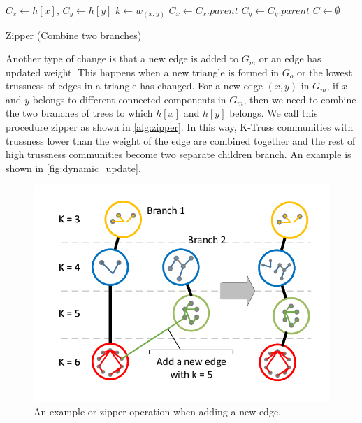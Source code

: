 \begin{algorithm}
	\BlankLine
	$C_x \gets h[x]$, $C_y \gets h[y]$\;
	$k \gets w_{(x,y)}$\;
	 {
		$C_x \gets C_{x}.parent$
	}
	 {
		$C_y \gets C_{y}.parent$
	}
	$C \gets \emptyset$ \;
	\caption{Zipper (Combine two branches)}\label{alg:zipper}
\end{algorithm}

Another type of change is that a new edge is added to $G_m$ or an edge has updated weight. This happens when a new triangle is formed in $G_o$ or the lowest trussness of edges in a triangle has changed. For a new edge $(x,y)$ in $G_m$, if $x$ and $y$ belongs to different connected components in $G_m$, then we need to combine the two branches of trees to which $h[x]$ and $h[y]$ belongs. We call this procedure zipper as shown in \autoref{alg:zipper}. In this way, K-Truss communities with trussness lower than the weight of the edge are combined together and the rest of high trussness communities become two separate children branch. An example is shown in \autoref{fig:dynamic_update}.

\begin{figure}[ht]
    \centering
    \includegraphics[width=\linewidth]{./figures/dynamic_update.pdf}
    \caption{An example or zipper operation when adding a new edge.}
    \label{fig:dynamic_update}
\end{figure}

